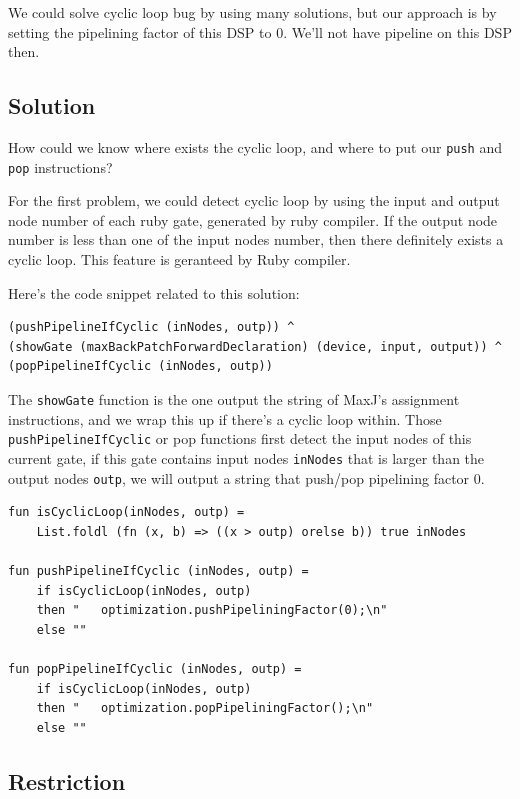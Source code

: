 \documentclass[a4paper, 10pt]{report}
\begin{document}
We could solve cyclic loop bug by using many solutions, but our approach is by setting the pipelining factor of this DSP to 0. We'll not have pipeline on this DSP then.

\subsection{Solution}

How could we know where exists the cyclic loop, and where to put our \texttt{push} and \texttt{pop} instructions? 

For the first problem, we could detect cyclic loop by using the input and output node number of each ruby gate, generated by ruby compiler. If the output node number is less than one of the input nodes number, then there definitely exists a cyclic loop. This feature is geranteed by Ruby compiler.

Here's the code snippet related to this solution:

\begin{lstlisting}[caption=Revision to fix cyclic loop]
(pushPipelineIfCyclic (inNodes, outp)) ^
(showGate (maxBackPatchForwardDeclaration) (device, input, output)) ^
(popPipelineIfCyclic (inNodes, outp))
\end{lstlisting}

The \texttt{showGate} function is the one output the string of MaxJ's assignment instructions, and we wrap this up if there's a cyclic loop within. Those \texttt{pushPipelineIfCyclic} or pop functions first detect the input nodes of this current gate, if this gate contains input nodes \texttt{inNodes} that is larger than the output nodes \texttt{outp}, we will output a string that push/pop pipelining factor 0.

\begin{lstlisting}[caption=Implementation of cyclic loop detector]
fun isCyclicLoop(inNodes, outp) = 
    List.foldl (fn (x, b) => ((x > outp) orelse b)) true inNodes

fun pushPipelineIfCyclic (inNodes, outp) = 
    if isCyclicLoop(inNodes, outp) 
    then "   optimization.pushPipeliningFactor(0);\n" 
    else ""

fun popPipelineIfCyclic (inNodes, outp) = 
    if isCyclicLoop(inNodes, outp) 
    then "   optimization.popPipeliningFactor();\n" 
    else ""
\end{lstlisting}

\subsection{Restriction}
\end{document}
